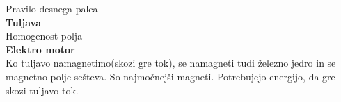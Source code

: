 {\color{bostonuniversityred}Pravilo desnega palca}\\
\textbf{Tuljava}\\
{\color{bostonuniversityred}Homogenost polja}\\
\textbf{Elektro motor}\\
Ko tuljavo namagnetimo(skozi gre tok), se namagneti tudi železno jedro in se magnetno polje sešteva. So najmočnejši magneti. Potrebujejo energijo, da gre skozi tuljavo tok.\\
